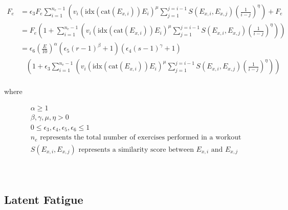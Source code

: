 \begin{minipage}{\textwidth}
	\begin{equation}
		\label{eq:P2C1_InterWorkoutFatigue}
		\begin{split}
			F_e & = 
			\epsilon_3 F_e 
			\sum_{i=1}^{n_e-1} \left( 
				v_i \left(
					\text{idx}(\text{cat}(E_{x,i})) E_i
				\right)^\mu 
				\sum_{j=1}^{j=i-1} S(E_{x,i},E_{x,j})\left(
					\frac{1}{i-j}
				\right)^\eta
			\right)
			+ F_e \\
			& = F_e \left(1+
				\sum_{i=1}^{n_e-1} \left( 
					v_i \left(
						\text{idx}(\text{cat}(E_{x,i})) E_i
					\right)^\mu  
					\sum_{j=1}^{j=i-1} S(E_{x,i},E_{x,j})\left(
						\frac{1}{i-j}
					\right)^\eta
				\right)
			\right)
			\\
			& = \epsilon_6 \left( \frac{E}{10} \right)^\alpha
				\left( \epsilon_5 (r-1)^\beta + 1 \right)
				\left(\epsilon_4 (s-1)^\gamma+1  \right)
				\\
				& \;\;\;
				\left(
					1+\epsilon_3 \sum_{i=1}^{n_e-1} \left( 
						v_i \left(
							\text{idx}(\text{cat}(E_{x,i})) E_i
						\right)^\mu 
						\sum_{j=1}^{j=i-1} S(E_{x,i},E_{x,j})\left(
							\frac{1}{i-j}
						\right)^\eta
					\right)
				\right)
			\\
		\end{split}
	\end{equation}
	\centerline{where}
	\begin{equation*}
		\begin{split}
		    & \alpha \ge 1 \\
		    & \beta,\gamma, \mu, \eta > 0 \\
			& 0 \le \epsilon_3, \epsilon_4, \epsilon_5, \epsilon_6 \le 1 \\
			& n_e \text{ represents the total number of exercises performed in a workout} \\
			& S(E_{x,i},E_{x,j}) \text{ represents a similarity score between } E_{x,i} \text{ and } E_{x,j} \\
		\end{split}
	\end{equation*}
\end{minipage}\\

\subsection{Latent Fatigue}
\label{sec:P2C1_LatentFatigue}

